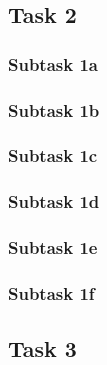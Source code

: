 \documentclass[a4paper, 12pt]{scrartcl}
\begin{document}
\subsection{Task 2}
\subsubsection{Subtask 1a}
\subsubsection{Subtask 1b}
\subsubsection{Subtask 1c}
\subsubsection{Subtask 1d}
\subsubsection{Subtask 1e}
\subsubsection{Subtask 1f}

\subsection{Task 3}
\end{document}
